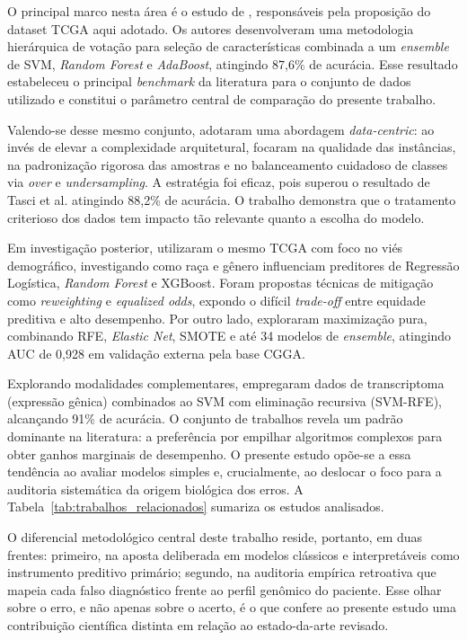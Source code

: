 \documentclass[12pt]{article}
\begin{document}
O principal marco nesta área é o estudo de \cite{tasci2022}, responsáveis pela proposição do dataset TCGA aqui adotado. Os autores desenvolveram uma metodologia hierárquica de votação para seleção de características combinada a um \textit{ensemble} de SVM, \textit{Random Forest} e \textit{AdaBoost}, atingindo 87,6\% de acurácia. Esse resultado estabeleceu o principal \textit{benchmark} da literatura para o conjunto de dados utilizado e constitui o parâmetro central de comparação do presente trabalho.

Valendo-se desse mesmo conjunto, \cite{sanchezmarques2024} adotaram uma abordagem \textit{data-centric}: ao invés de elevar a complexidade arquitetural, focaram na qualidade das instâncias, na padronização rigorosa das amostras e no balanceamento cuidadoso de classes via \textit{over} e \textit{undersampling}. A estratégia foi eficaz, pois superou o resultado de Tasci et al. atingindo 88,2\% de acurácia. O trabalho demonstra que o tratamento criterioso dos dados tem impacto tão relevante quanto a escolha do modelo.

Em investigação posterior, \cite{sanchezmarques2026} utilizaram o mesmo TCGA com foco no viés demográfico, investigando como raça e gênero influenciam preditores de Regressão Logística, \textit{Random Forest} e XGBoost. Foram propostas técnicas de mitigação como \textit{reweighting} e \textit{equalized odds}, expondo o difícil \textit{trade-off} entre equidade preditiva e alto desempenho. Por outro lado, \cite{liu2025} exploraram maximização pura, combinando RFE, \textit{Elastic Net}, SMOTE e até 34 modelos de \textit{ensemble}, atingindo AUC de 0,928 em validação externa pela base CGGA.

Explorando modalidades complementares, \cite{munquad2022} empregaram dados de transcriptoma (expressão gênica) combinados ao SVM com eliminação recursiva (SVM-RFE), alcançando 91\% de acurácia. O conjunto de trabalhos revela um padrão dominante na literatura: a preferência por empilhar algoritmos complexos para obter ganhos marginais de desempenho. O presente estudo opõe-se a essa tendência ao avaliar modelos simples e, crucialmente, ao deslocar o foco para a auditoria sistemática da origem biológica dos erros. A Tabela~\ref{tab:trabalhos_relacionados} sumariza os estudos analisados.

O diferencial metodológico central deste trabalho reside, portanto, em duas frentes: primeiro, na aposta deliberada em modelos clássicos e interpretáveis como instrumento preditivo primário; segundo, na auditoria empírica retroativa que mapeia cada falso diagnóstico frente ao perfil genômico do paciente. Esse olhar sobre o erro, e não apenas sobre o acerto, é o que confere ao presente estudo uma contribuição científica distinta em relação ao estado-da-arte revisado.
\end{document}
